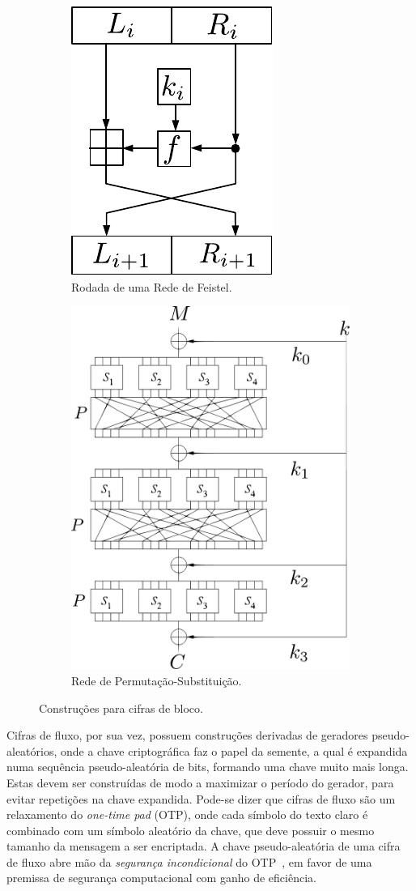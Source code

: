 \documentclass{SBCbookchapter}
\begin{document}
\begin{figure}[htbp]
\centering
\begin{subfigure}{.5\textwidth}
  \centering
  \includegraphics[width=.4\linewidth]{figures/feistel.pdf}
  \caption{Rodada de uma Rede de Feistel.}
  \label{fig:feistel}
\end{subfigure}%
\begin{subfigure}{.5\textwidth}
  \centering
  \includegraphics[width=.7\linewidth]{figures/spn.pdf}
  \caption{Rede de Permutação-Substituição.}
  \label{fig:spn}
\end{subfigure}
\caption{Construções para cifras de bloco.}
\label{fig:bloco}
\end{figure}

Cifras de fluxo, por sua vez, possuem construções derivadas de geradores pseudo-aleatórios, onde a chave criptográfica faz o papel da semente, a qual é expandida numa sequência pseudo-aleatória de bits, formando uma chave muito mais longa. Estas devem ser construídas de modo a maximizar o período do gerador, para evitar repetições na chave expandida. Pode-se dizer que cifras de fluxo são um relaxamento do \emph{one-time pad} (OTP), onde cada símbolo do texto claro é combinado com um símbolo aleatório da chave, que deve possuir o mesmo tamanho da mensagem a ser encriptada. A chave pseudo-aleatória de uma cifra de fluxo abre mão da \emph{segurança incondicional} do OTP~\cite{Shannon49}, em favor de uma premissa de segurança computacional com ganho de eficiência.
\end{document}
